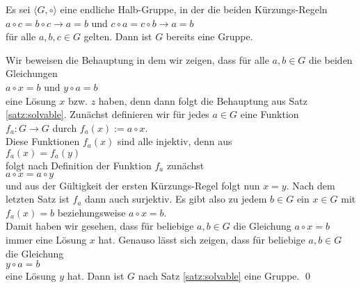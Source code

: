 \begin{Satz}
  Es sei $\langle G, \circ \rangle$ eine endliche Halb-Gruppe, in der die beiden K\"{u}rzungs-Regeln
  \\[0.2cm]
  \hspace*{1.3cm}
  $a \circ c = b \circ c \rightarrow a = b$ \quad und \quad
  $c \circ a = c \circ b \rightarrow a = b$
  \\[0.2cm]
  f\"{u}r alle $a,b,c \in G$ gelten.  Dann ist $G$ bereits eine Gruppe.
\end{Satz}

\proof Wir beweisen die Behauptung in dem wir zeigen, dass f\"{u}r alle $a,b \in G$ die beiden Gleichungen
\\[0.2cm]
\hspace*{1.3cm} $a \circ x = b$ \quad und \quad $y \circ a = b$
\\[0.2cm]
eine L\"{o}sung $x$ bzw. $z$ haben, denn dann folgt die Behauptung aus Satz \ref{satz:solvable}.  Zun\"{a}chst definieren wir f\"{u}r
jedes $a \in G$ eine Funktion
\\[0.2cm]
\hspace*{1.3cm} $f_a: G \rightarrow G$ \quad durch \quad $f_a(x) := a \circ x$.
\\[0.2cm]
Diese Funktionen $f_a(x)$ sind alle injektiv, denn aus
\\[0.2cm]
\hspace*{1.3cm} $f_a(x) = f_a(y)$
\\[0.2cm]
folgt nach Definition der Funktion $f_a$ zun\"{a}chst
\\[0.2cm]
\hspace*{1.3cm} $a \circ x = a \circ y$
\\[0.2cm]
und aus der G\"{u}ltigkeit der ersten K\"{u}rzungs-Regel folgt nun $x = y$.  Nach dem letzten Satz ist $f_a$ dann
auch surjektiv.  Es gibt also zu jedem $b \in G$ ein $x \in G$ mit
\\[0.2cm]
\hspace*{1.3cm} $f_a(x) = b$ \quad beziehungsweise \quad $a \circ x = b$.
\\[0.2cm]
Damit haben wir gesehen, dass f\"{u}r beliebige $a,b \in G$ die Gleichung $a \circ x = b$ immer eine L\"{o}sung
$x$ hat.  Genauso l\"{a}sst sich  zeigen, dass f\"{u}r beliebige $a,b \in G$ die Gleichung
\\[0.2cm]
\hspace*{1.3cm}
$y \circ a = b$
\\[0.2cm]
eine L\"{o}sung $y$ hat.  Dann ist $G$ nach Satz \ref{satz:solvable} eine Gruppe. \qed

